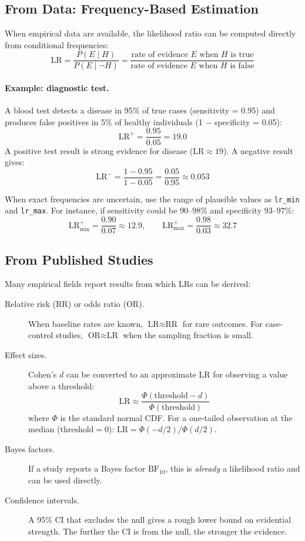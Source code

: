 \documentclass[11pt,a4paper]{article}
\begin{document}
\subsection{From Data: Frequency-Based Estimation}

When empirical data are available, the likelihood ratio can be computed
directly from conditional frequencies:
\begin{equation}
\text{LR} = \frac{P(E \mid H)}{P(E \mid \neg H)}
= \frac{\text{rate of evidence } E \text{ when } H \text{ is true}}
       {\text{rate of evidence } E \text{ when } H \text{ is false}}
\end{equation}

\paragraph{Example: diagnostic test.}
A blood test detects a disease in 95\% of true cases (sensitivity = 0.95) and
produces false positives in 5\% of healthy individuals (1 $-$ specificity = 0.05):
\[
\text{LR}^+ = \frac{0.95}{0.05} = 19.0
\]
A positive test result is strong evidence for disease
($\text{LR} \approx 19$). A negative result gives:
\[
\text{LR}^- = \frac{1 - 0.95}{1 - 0.05} = \frac{0.05}{0.95} \approx 0.053
\]

When exact frequencies are uncertain, use the range of plausible values as
\texttt{lr\_min} and \texttt{lr\_max}. For instance, if sensitivity could be
90--98\% and specificity 93--97\%:
\[
\text{LR}^+_{\min} = \frac{0.90}{0.07} \approx 12.9, \qquad
\text{LR}^+_{\max} = \frac{0.98}{0.03} \approx 32.7
\]

\subsection{From Published Studies}

Many empirical fields report results from which LRs can be derived:

\begin{description}
\item[Relative risk (RR) or odds ratio (OR).] When baseline rates are known,
  $\text{LR} \approx \text{RR}$ for rare outcomes. For case-control studies,
  $\text{OR} \approx \text{LR}$ when the sampling fraction is small.

\item[Effect sizes.] Cohen's $d$ can be converted to an approximate LR for
  observing a value above a threshold:
  \[
  \text{LR} \approx \frac{\Phi(\text{threshold} - d)}{\Phi(\text{threshold})}
  \]
  where $\Phi$ is the standard normal CDF. For a one-tailed observation at
  the median ($\text{threshold} = 0$): $\text{LR} = \Phi(-d/2) / \Phi(d/2)$.

\item[Bayes factors.] If a study reports a Bayes factor $\text{BF}_{10}$, this
  is \emph{already} a likelihood ratio and can be used directly.

\item[Confidence intervals.] A 95\% CI that excludes the null gives a
  rough lower bound on evidential strength.  The further the CI is from the
  null, the stronger the evidence.
\end{description}
\end{document}
